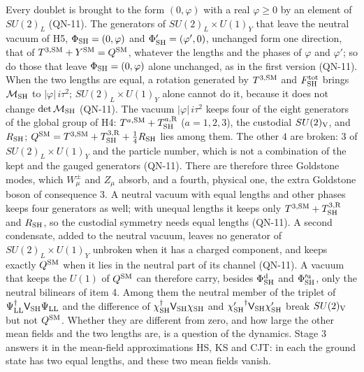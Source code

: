 \documentclass[
  10pt,
]{article}
\begin{document}
Every doublet is brought to the form \((0,\varphi)\) with a real
\(\varphi\ge0\) by an element of \(SU(2)_L\) (QN-11). The generators of
\(SU(2)_L\times U(1)_Y\) that leave the neutral vacuum of H5,
\(\Phi_{\rm SH}=(0,\varphi)\) and \(\Phi'_{\rm SH}=(\varphi',0)\),
unchanged form one direction, that of
\(T^{3,{\rm SM}}+Y^{\rm SM}=Q^{\rm SM}\), whatever the lengths and the
phases of \(\varphi\) and \(\varphi'\); so do those that leave
\(\Phi_{\rm SH}=(0,\varphi)\) alone unchanged, as in the first version
(QN-11). When the two lengths are equal, a rotation generated by
\(T^{3,{\rm SM}}\) and \(F^{\rm tot}_{\rm SH}\) brings
\(\mathcal M_{\rm SH}\) to \(\lvert\varphi\rvert\,i\tau^2\);
\(SU(2)_L\times U(1)_Y\) alone cannot do it, because it does not change
\(\det\mathcal M_{\rm SH}\) (QN-11). The vacuum
\(\lvert\varphi\rvert\,i\tau^2\) keeps four of the eight generators of
the global group of H4: \(T^{a,{\rm SM}}+T^{a,{\rm R}}_{\rm SH}\)
(\(a=1,2,3\)), the custodial \(SU(2)_{\rm V}\), and \(R_{\rm SH}\);
\(Q^{\rm SM}=T^{3,{\rm SM}}+T^{3,{\rm R}}_{\rm SH}+\tfrac14R_{\rm SH}\)
lies among them. The other \(4\) are broken: \(3\) of
\(SU(2)_L\times U(1)_Y\) and the particle number, which is not a
combination of the kept and the gauged generators (QN-11). There are
therefore three Goldstone modes, which \(W^\pm_\mu\) and \(Z_\mu\)
absorb, and a fourth, physical one, the extra Goldstone boson of
consequence 3. A neutral vacuum with equal lengths and other phases
keeps four generators as well; with unequal lengths it keeps only
\(T^{3,{\rm SM}}+T^{3,{\rm R}}_{\rm SH}\) and \(R_{\rm SH}\), so the
custodial symmetry needs equal lengths (QN-11). A second condensate,
added to the neutral vacuum, leaves no generator of
\(SU(2)_L\times U(1)_Y\) unbroken when it has a charged component, and
keeps exactly \(Q^{\rm SM}\) when it lies in the neutral part of its
channel (QN-11). A vacuum that keeps the \(U(1)\) of \(Q^{\rm SM}\) can
therefore carry, besides \(\Phi^{\rm d}_{\rm SH}\) and
\(\Phi'^{\rm u}_{\rm SH}\), only the neutral bilinears of item 4. Among
them the neutral member of the triplet of
\(\Psi^\dagger_{\rm LL}\mathsf V_{\rm SH}\Psi_{\rm LL}\) and the
difference of \(\chi^\dagger_{\rm SH}\mathsf V_{\rm SH}\chi_{\rm SH}\)
and \({\chi'_{\rm SH}}^\dagger\mathsf V_{\rm SH}\chi'_{\rm SH}\) break
\(SU(2)_{\rm V}\) but not \(Q^{\rm SM}\). Whether they are different
from zero, and how large the other mean fields and the two lengths are,
is a question of the dynamics. Stage 3 answers it in the mean-field
approximations HS, KS and CJT: in each the ground state has two equal
lengths, and these two mean fields vanish.
\end{document}
